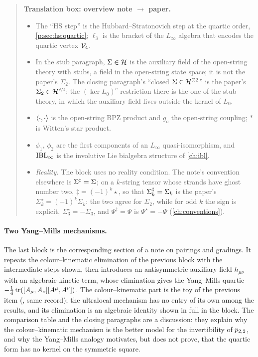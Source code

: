 \begin{quote}
  \small
  \textbf{Translation box: overview note $\to$ paper.}
  \begin{itemize}
    \setlength{\itemsep}{0.3ex}
    \item The \enquote{HS step} is the Hubbard--Stratonovich step at the quartic order, \cref{p:sec:hs:quartic}; $\ell_3$ is the bracket of the $L_\infty$ algebra that encodes the quartic vertex $\mathcal{V}_{4}$.
    \item In the stub paragraph, $\Sigma \in \mathcal{H}$ is the auxiliary field of the open-string theory with stubs, a field in the open-string state space; it is not the paper's $\Sigma_2$.
      The closing paragraph's \enquote{closed $\Sigma \in \mathcal{H}^{\otimes 2}$} is the paper's $\Sigma_2 \in \mathcal{H}^{\wedge 2}$; the $(\ker L_0)^c$ restriction there is the one of the stub theory, in which the auxiliary field lives outside the kernel of $L_0$.
    \item $\left \langle \cdot, \cdot \right \rangle$ is the open-string BPZ product and $g_o$ the open-string coupling; $*$ is Witten's star product.
    \item $\phi_1$, $\phi_2$ are the first components of an $L_\infty$ quasi-isomorphism, and $\mathrm{IBL}_\infty$ is the involutive Lie bialgebra structure of \cref{ch:ibl}.
    \item \emph{Reality.} The block uses no reality condition. The note's convention elsewhere is $\Sigma^\ddagger = \Sigma$; on a $k$-string tensor whose strands have ghost number two, $\ddagger = (-1)^k \star$, so that $\Sigma_k^\ddagger = \Sigma_k$ is the paper's $\Sigma_k^\star = (-1)^k \Sigma_k$: the two agree for $\Sigma_2$, while for odd $k$ the sign is explicit, $\Sigma_3^\star = - \Sigma_3$, and $\Psi^\ddagger = \Psi$ is $\Psi^\star = - \Psi$ (\cref{ch:conventions}).
  \end{itemize}
\end{quote}



\paragraph{Two Yang--Mills mechanisms.}
The last block is the corresponding section of a note on pairings and gradings.
It repeats the colour--kinematic elimination of the previous block with the intermediate steps shown, then introduces an antisymmetric auxiliary field $h_{\mu\nu}$ with an algebraic kinetic term, whose elimination gives the Yang--Mills quartic $- \frac{1}{4} \operatorname{tr}([A_\mu, A_\nu] [A^\mu, A^\nu])$.
The colour--kinematic part is the toy of the previous item (, same record); the ultralocal mechanism has no entry of its own among the results, and its elimination is an algebraic identity shown in full in the block.
The comparison table and the closing paragraphs are a discussion: they explain why the colour--kinematic mechanism is the better model for the invertibility of $p_{2,2}$, and why the Yang--Mills analogy motivates, but does not prove, that the quartic form has no kernel on the symmetric square.

